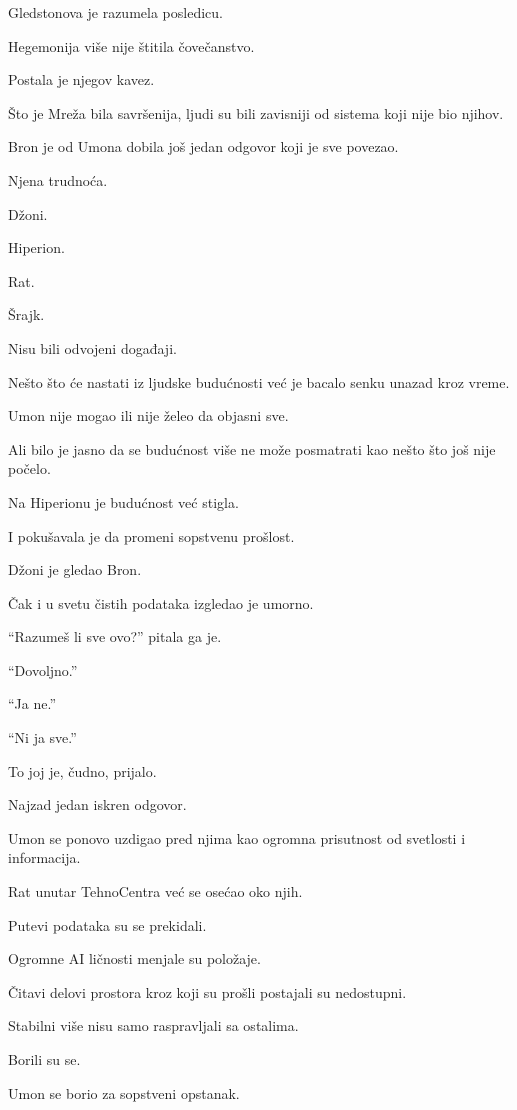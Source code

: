 Gledstonova je razumela posledicu.

Hegemonija više nije štitila čovečanstvo.

Postala je njegov kavez.

Što je Mreža bila savršenija, ljudi su bili zavisniji od sistema koji nije bio njihov.

\bigskip

Bron je od Umona dobila još jedan odgovor koji je sve povezao.

Njena trudnoća.

Džoni.

Hiperion.

Rat.

Šrajk.

Nisu bili odvojeni događaji.

Nešto što će nastati iz ljudske budućnosti već je bacalo senku unazad kroz vreme.

Umon nije mogao ili nije želeo da objasni sve.

Ali bilo je jasno da se budućnost više ne može posmatrati kao nešto što još nije počelo.

Na Hiperionu je budućnost već stigla.

I pokušavala je da promeni sopstvenu prošlost.

\bigskip

Džoni je gledao Bron.

Čak i u svetu čistih podataka izgledao je umorno.

``Razumeš li sve ovo?'' pitala ga je.

``Dovoljno.''

``Ja ne.''

``Ni ja sve.''

To joj je, čudno, prijalo.

Najzad jedan iskren odgovor.

\bigskip

Umon se ponovo uzdigao pred njima kao ogromna prisutnost od svetlosti i informacija.

Rat unutar TehnoCentra već se osećao oko njih.

Putevi podataka su se prekidali.

Ogromne AI ličnosti menjale su položaje.

Čitavi delovi prostora kroz koji su prošli postajali su nedostupni.

Stabilni više nisu samo raspravljali sa ostalima.

Borili su se.

Umon se borio za sopstveni opstanak.

